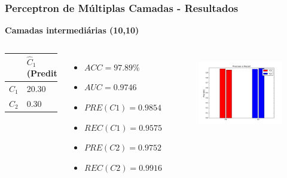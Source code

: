 \documentclass{beamer}
\begin{document}
\begin{frame}
\frametitle{Perceptron de Múltiplas Camadas - Resultados}
\textbf{Camadas intermediárias (10,10)}
\begin{columns}[c] 
\begin{table}
\begin{tabular}{l l l}
\toprule
 & \textbf{$\hat{C}_1$ (Predita)} & \textbf{$\hat{C}_2$(Predita)}\\
\midrule
$C_1$ & 20.30 & 0.90 \\
$C_2$ & 0.30  & 35.40\\ 
\bottomrule
\end{tabular}
\begin{itemize}
\item $ACC = 97.89 \%$
\item $AUC = 0.9746  $
\item $PRE(C1) = 0.9854$
\item $REC(C1) = 0.9575$
\item $PRE(C2) = 0.9752$
\item $REC(C2) = 0.9916$
\end{itemize}
\end{table}

\begin{figure}[H]
\centering
  \includegraphics[width=\linewidth]{../img/mlp_10x10.png}
  \label{fig:percep}
\end{figure}%

\end{columns}
\end{frame}
\end{document}
